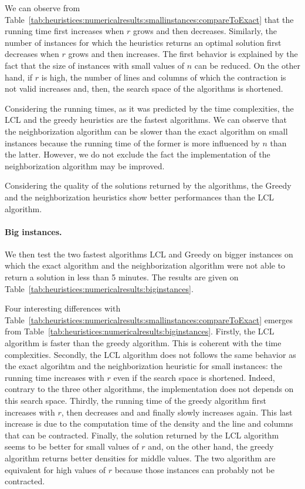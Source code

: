 We can observe from Table~\ref{tab:heuristices:numericalresults:smallinstances:compareToExact} that the running time first increases when $r$ grows and then decreases. Similarly, the number of instances for which the heuristics returns an optimal solution first decreases when $r$ grows and then increases. The first behavior is explained by the fact that the size of instances with small values of $n$ can be reduced. On the other hand, if $r$ is high, the number of lines and columns of which the contraction is not valid increases and, then, the search space of the algorithms is shortened.

Considering the running times, as it was predicted by the time complexities, the LCL and the greedy heuristics are the fastest algorithms. We can observe that the neighborization algorithm can be slower than the exact algorithm on small instances because the running time of the former is more influenced by $n$ than the latter. However, we do not exclude the fact the implementation of the neighborization algorithm may be improved.

Considering the quality of the solutions returned by the algorithms, the Greedy and the neighborization heuristics show better performances than the LCL algorithm.

\paragraph{Big instances. }
We then test the two fastest algorithms LCL and Greedy on bigger instances on which the exact algorithm and the neighborization algorithm were not able to return a solution in less than 5 minutes. The results are given on Table~\ref{tab:heuristices:numericalresults:biginstances}.

\begin{table}[ht!]
	\centering
	\def\arraystretch{1.2}
	\setlength\tabcolsep{0.075cm}
	
	\caption{}
	\label{tab:heuristices:numericalresults:biginstances}
\end{table}

Four interesting differences with Table~\ref{tab:heuristices:numericalresults:smallinstances:compareToExact} emerges from Table~\ref{tab:heuristices:numericalresults:biginstances}. Firstly, the LCL algorithm is faster than the greedy algorithm. This is coherent with the time complexities. Secondly, the LCL algorithm does not follows the same behavior as the exact algorihtm and the neighborization heuristic for small instances: the running time increases with $r$ even if the search space is shortened. Indeed, contrary to the three other algorithms, the implementation does not depends on this search space. Thirdly, the running time of the greedy algorithm first increases with $r$, then decreases and and finally slowly increases again. This last increase is due to the computation time of the density and the line and columns that can be contracted.  Finally, the solution returned by the LCL algorithm seems to be better for small values of $r$ and, on the other hand, the greedy algorithm returns better densities for middle values. The two algorithm are equivalent for high values of $r$ because those instances can probably not be contracted.